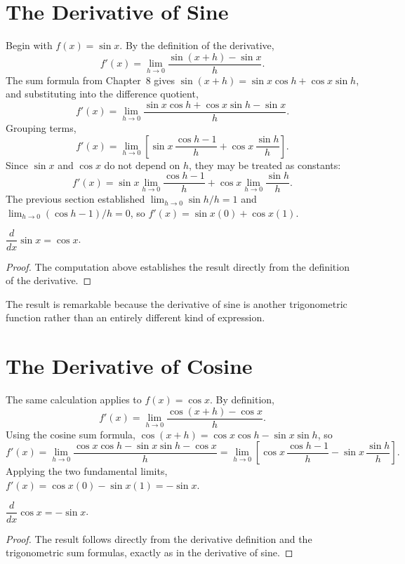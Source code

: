 \section{The Derivative of Sine}

Begin with $f(x) = \sin x$. By the definition of the derivative,
\[
f'(x) = \lim_{h\to0} \frac{\sin(x+h)-\sin x}{h}.
\]
The sum formula from Chapter~8 gives $\sin(x+h) = \sin x\cos h + \cos
x\sin h$, and substituting into the difference quotient,
\[
f'(x) = \lim_{h\to0} \frac{\sin x\cos h + \cos x\sin h - \sin x}{h}.
\]
Grouping terms,
\[
f'(x) = \lim_{h\to0} \left[\sin x\,\frac{\cos h-1}{h} + \cos
x\,\frac{\sin h}{h}\right].
\]
Since $\sin x$ and $\cos x$ do not depend on $h$, they may be treated as
constants:
\[
f'(x) = \sin x \lim_{h\to0}\frac{\cos h-1}{h} + \cos x
\lim_{h\to0}\frac{\sin h}{h}.
\]
The previous section established $\lim_{h\to0} \sin h/h = 1$ and
$\lim_{h\to0} (\cos h-1)/h = 0$, so $f'(x) = \sin x(0) + \cos x(1)$.

\begin{theorem}
$\dfrac{d}{dx}\sin x = \cos x$.
\end{theorem}

\begin{proof}
The computation above establishes the result directly from the
definition of the derivative.
\end{proof}

The result is remarkable because the derivative of sine is another
trigonometric function rather than an entirely different kind of
expression.

\section{The Derivative of Cosine}

The same calculation applies to $f(x) = \cos x$. By definition,
\[
f'(x) = \lim_{h\to0} \frac{\cos(x+h)-\cos x}{h}.
\]
Using the cosine sum formula, $\cos(x+h) = \cos x\cos h - \sin x\sin h$,
so
\[
f'(x) = \lim_{h\to0} \frac{\cos x\cos h - \sin x\sin h - \cos x}{h} =
\lim_{h\to0}\left[\cos x\,\frac{\cos h-1}{h} - \sin x\,\frac{\sin
h}{h}\right].
\]
Applying the two fundamental limits, $f'(x) = \cos x(0) - \sin x(1) =
-\sin x$.

\begin{theorem}
$\dfrac{d}{dx}\cos x = -\sin x$.
\end{theorem}

\begin{proof}
The result follows directly from the derivative definition and the
trigonometric sum formulas, exactly as in the derivative of sine.
\end{proof}

